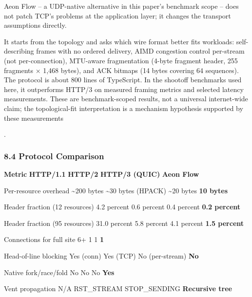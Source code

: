 \documentclass[
]{article}
\begin{document}
Aeon Flow -- a UDP-native alternative in this paper's benchmark scope --
does not patch TCP's problems at the application layer; it changes the
transport assumptions directly.

It starts from the topology and asks which wire format better fits
workloads: self-describing frames with no ordered delivery, AIMD
congestion control per-stream (not per-connection), MTU-aware
fragmentation (4-byte fragment header, 255 fragments × 1,468 bytes), and
ACK bitmaps (14 bytes covering 64 sequences). The protocol is about 800
lines of TypeScript. In the shootoff benchmarks used here, it
outperforms HTTP/3 on measured framing metrics and selected latency
measurements. These are benchmark-scoped results, not a universal
internet-wide claim; the topological-fit interpretation is a mechanism
hypothesis supported by these measurements

.

\subsubsection{\texorpdfstring{\textbf{8.4 Protocol
Comparison}}{8.4 Protocol Comparison}}\label{protocol-comparison}

\textbf{Metric} \textbar{} \textbf{HTTP/1.1} \textbar{} \textbf{HTTP/2}
\textbar{} \textbf{HTTP/3 (QUIC)} \textbar{} \textbf{Aeon Flow}
\textbar{}

Per-resource overhead \textbar{} \textasciitilde200 bytes \textbar{}
\textasciitilde30 bytes (HPACK) \textbar{} \textasciitilde20 bytes
\textbar{} \textbf{10 bytes} \textbar{}

Header fraction (12 resources) \textbar{} 4.2 percent \textbar{} 0.6
percent \textbar{} 0.4 percent \textbar{} \textbf{0.2 percent}
\textbar{}

Header fraction (95 resources) \textbar{} 31.0 percent \textbar{} 5.8
percent \textbar{} 4.1 percent \textbar{} \textbf{1.5 percent}
\textbar{}

Connections for full site \textbar{} 6+ \textbar{} 1 \textbar{} 1
\textbar{} \textbf{1} \textbar{}

Head-of-line blocking \textbar{} Yes (conn) \textbar{} Yes (TCP)
\textbar{} No (per-stream) \textbar{} \textbf{No} \textbar{}

Native fork/race/fold \textbar{} No \textbar{} No \textbar{} No
\textbar{} \textbf{Yes} \textbar{}

Vent propagation \textbar{} N/A \textbar{} RST\_STREAM \textbar{}
STOP\_SENDING \textbar{} \textbf{Recursive tree} \textbar{}
\end{document}
